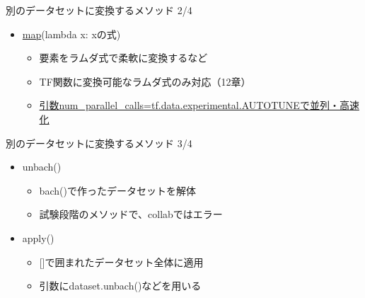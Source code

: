 \documentclass[aspectratio=169, dvipdfmx, 14pt, xcolor={svgnames,dvipsnames}, t]{beamer}
\begin{document}
\begin{frame}{別のデータセットに変換するメソッド 2/4}\label{ux5225ux306eux30c7ux30fcux30bfux30bbux30c3ux30c8ux306bux5909ux63dbux3059ux308bux30e1ux30bdux30c3ux30c9-24}

  \begin{itemize}
    \tightlist
    \item
          \href{https://qiita.com/conf8o/items/0cb02bc504b51af09099}{map}(lambda
          x: xの式)

          \begin{itemize}
            \tightlist
            \item
                  要素をラムダ式で柔軟に変換するなど
            \item
                  TF関数に変換可能なラムダ式のみ対応（12章）
            \item
                  \href{https://tensorflow.classcat.com/2019/03/23/tf20-alpha-guide-data-performance/}{引数num\_parallel\_calls=tf.data.experimental.AUTOTUNEで並列・高速化}
          \end{itemize}
  \end{itemize}

\end{frame}


\begin{frame}{別のデータセットに変換するメソッド 3/4}\label{ux5225ux306eux30c7ux30fcux30bfux30bbux30c3ux30c8ux306bux5909ux63dbux3059ux308bux30e1ux30bdux30c3ux30c9-34}

  \begin{itemize}
    \tightlist
    \item
          unbach()

          \begin{itemize}
            \tightlist
            \item
                  bach()で作ったデータセットを解体
            \item
                  試験段階のメソッドで、collabではエラー
          \end{itemize}
    \item
          apply()

          \begin{itemize}
            \tightlist
            \item
                  {[}{]}で囲まれたデータセット全体に適用
            \item
                  引数にdataset.unbach()などを用いる
          \end{itemize}
  \end{itemize}

\end{frame}
\end{document}
